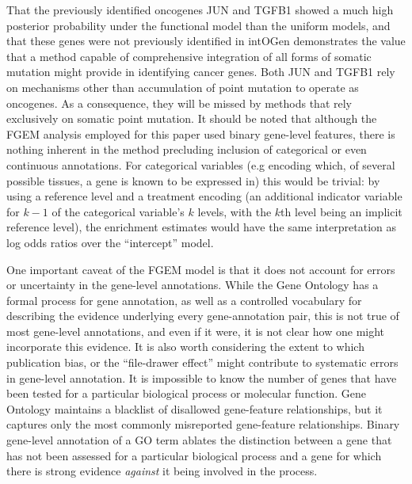 That the previously identified oncogenes JUN and TGFB1 showed a much high posterior probability under the functional model than the uniform models, and that these genes were not previously identified in intOGen demonstrates the value that a method capable of comprehensive integration of all forms of somatic mutation might provide in identifying cancer genes.  Both JUN and TGFB1 rely on mechanisms other than accumulation of point mutation to operate as oncogenes.  As a consequence, they will be missed by methods that rely exclusively on somatic point mutation.
It should be noted that although the FGEM analysis employed for this paper used binary gene-level features, there is nothing inherent in the method precluding inclusion of categorical or even continuous annotations.  For categorical variables (e.g encoding which, of several possible tissues, a gene is known to be expressed in) this would be
trivial: by using a reference level\cite{chambers1992statistical} and a treatment encoding (an additional indicator variable for $k-1$ of the categorical variable's $k$ levels, with the $k$th level being an implicit reference level), the enrichment estimates would have the same interpretation as log odds ratios over the ``intercept'' model.

One important caveat of the FGEM model is that it does not account for errors or uncertainty in the gene-level annotations.  While the Gene Ontology has a formal process for gene annotation, as well as a controlled vocabulary for describing the evidence underlying every gene-annotation pair, this is not true of most gene-level annotations, and even if it were, it is not clear how one might incorporate this evidence.  It is also worth considering the extent to which publication bias, or the ``file-drawer effect'' might contribute to systematic errors in gene-level annotation. It is impossible to know the number of genes that have been tested for a particular biological process or molecular function.  Gene Ontology maintains a blacklist of disallowed gene-feature relationships\cite{huntley14_under_how_why_gene_ontol}, but it captures only the most commonly misreported gene-feature relationships.  Binary gene-level annotation of a GO term ablates the distinction between a gene that has not been assessed for a particular biological process and a gene for which there is strong evidence \emph{against} it being involved in the process.


